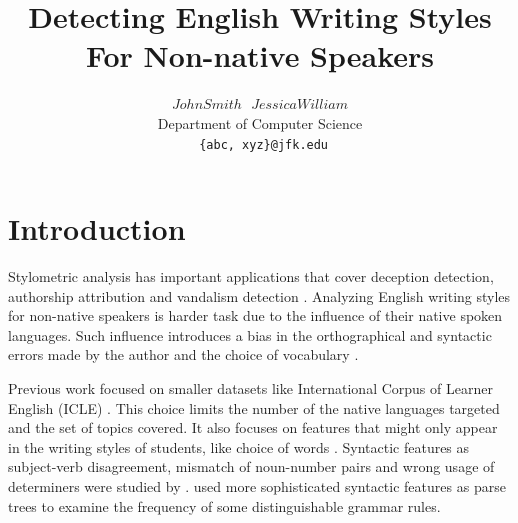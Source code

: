 \documentclass[10pt,a5paper,twoside]{article}
\title{Detecting English Writing Styles For Non-native Speakers}
\author{$John Smith ~~~ Jessica William$ \\
  Department of Computer Science \\
  \texttt{ \{abc, xyz\}@jfk.edu}}
\begin{document}
\maketitle
{}


\newpage

\section{Introduction}
Stylometric analysis has important applications that cover deception detection,
authorship attribution and vandalism detection \cite{Harpalani, Ott}.
Analyzing English writing styles for non-native speakers is harder task due to the
influence of their native spoken languages.
Such influence introduces a bias in the orthographical and syntactic errors made by the author and the choice of vocabulary \cite{koppel2005automatically}.

Previous work focused on smaller datasets like {International Corpus of Learner English} (ICLE) \cite{koppel2005automatically, koppel2005determining, argamon2009automatically}. This choice limits the number of the native languages targeted and the set of topics covered.
It also focuses on features that might only appear in the writing styles of
students, like choice of words \cite{tsur2007using, zheng2003authorship,
gamon2004linguistic}. Syntactic features as subject-verb disagreement, mismatch
of noun-number pairs and wrong usage of determiners were studied by
\cite{wong2009contrastive}.
\cite{wong2010parser, wongdras2011EMNLP} used more sophisticated syntactic features as parse trees
to examine the frequency of some distinguishable grammar rules.
\end{document}
